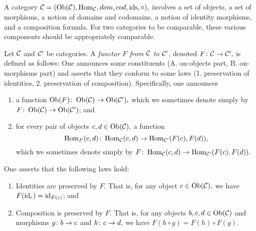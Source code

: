 \documentclass[../main/CT4S-EN-RU]{subfiles}
\begin{document}
\begin{remarkRUS}
\end{remarkRUS}


\subsection{}

\begin{blockENG}
A category $\mathcal{C}=(\operatorname{Ob}(\mathcal{C}),\operatorname{Hom}_\mathcal{C},dom,cod,\operatorname{ids},\circ),$ involves a set of objects, a set of morphisms, a notion of domains and codomains, a notion of identity morphisms, and a composition formula. For two categories to be comparable, these various components should be appropriately comparable.
\end{blockENG}

\begin{blockRUS}
\end{blockRUS}

\begin{definitionENG}\label{def:functor}
Let $\mathcal{C}$ and $\mathcal{C}'$ be categories. A {\em functor $F$ from $\mathcal{C}$ to $\mathcal{C}'$}, denoted $F\colon\mathcal{C}\rightarrow\mathcal{C}',$ is defined as follows: One announces some constituents (A. on-objects part, B. on-morphisms part) and asserts that they conform to some laws (1. preservation of identities, 2. preservation of composition). Specifically, one announces
\begin{enumerate}[\hsp A.]
\item a function $\operatorname{Ob}(F)\colon\operatorname{Ob}(\mathcal{C})\rightarrow\operatorname{Ob}(\mathcal{C}'),$ which we sometimes denote simply by $F\colon\operatorname{Ob}(\mathcal{C})\rightarrow\operatorname{Ob}(\mathcal{C}')$; and
\item for every pair of objects $c,d\in\operatorname{Ob}(\mathcal{C}),$ a function $$\operatorname{Hom}_F(c,d)\colon\operatorname{Hom}_\mathcal{C}(c,d)\rightarrow\operatorname{Hom}_{\mathcal{C}'}(F(c),F(d)),$$ which we sometimes denote simply by $F\colon\operatorname{Hom}_\mathcal{C}(c,d)\rightarrow\operatorname{Hom}_{\mathcal{C}'}(F(c),F(d)).$
\end{enumerate}
One asserts that the following laws hold:
\begin{enumerate}[\hsp 1.]
\item Identities are preserved by $F.$ That is, for any object $c\in\operatorname{Ob}(\mathcal{C}),$ we have $F(\operatorname{id}_c)=\operatorname{id}_{F(c)}$; and
\item Composition is preserved by $F.$ That is, for any objects $b,c,d\in\operatorname{Ob}(\mathcal{C})$ and morphisms $g\colon b\rightarrow c$ and $h\colon c\rightarrow d,$ we have $F(h\circ g)=F(h)\circ F(g).$
\end{enumerate}
\end{definitionENG}
\end{document}
